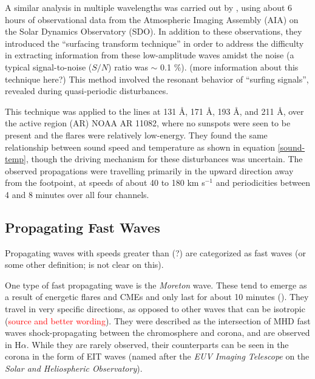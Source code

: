 \documentclass[preprint2]{aastex}
\begin{document}
A similar analysis in multiple wavelengths was carried out by
\cite{pac_2}, using about 6 hours of observational data from the
Atmospheric Imaging Assembly (AIA) on the Solar Dynamics Observatory (SDO).
In addition to these observations, they introduced the
``surfacing transform technique''
in order to address the difficulty in extracting information from these
low-amplitude waves amidst the noise (a typical signal-to-noise
($S/N$) ratio was $\sim$ 0.1 \%). (more information about this
technique here?)
This method involved the resonant behavior of ``surfing signals'',
revealed during quasi-periodic disturbances.

This technique was applied to the lines at
131 \AA{}, 171 \AA{}, 193 \AA{}, and 211 \AA{},
over the active region (AR) NOAA AR 11082, where no sunspots were seen
to be present and the flares were relatively low-energy.
They found the same relationship between sound speed and temperature
as shown in equation \ref{sound-temp}, though the driving mechanism
for these disturbances was uncertain. The observed propagations were
travelling primarily in the upward direction away from the footpoint,
at speeds of about 40 to 180 km s$^{-1}$ and periodicities between 4
and 8 minutes over all four channels.


\subsection{Propagating Fast Waves}
Propagating waves with speeds greater than (?) are categorized as
fast waves (or some other definition; \cite{Nak} is not clear on this).

One type of fast propagating wave is the \emph{Moreton} wave. These tend
to emerge as a result of energetic flares and CMEs and only last for
about 10 minutes (\cite{pfw_1}).
They travel in very specific directions, as opposed to other waves that
can be isotropic (\textcolor{red}{source and better wording}).
They were described as the intersection of MHD fast waves shock-propagating
between the chromosphere and corona, and are observed in H$\alpha$.
While they are rarely observed, their
counterparts can be seen in the corona in the form of EIT waves
(named after the \emph{EUV Imaging Telescope} on the
\emph{Solar and Heliospheric Observatory}).
\end{document}
